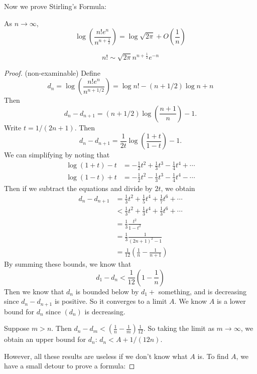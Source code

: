 \documentclass[a4paper]{article}
\begin{document}
Now we prove Stirling's Formula:
\begin{thm}
  As $n\to \infty$,
  \[
    \log\left(\frac{n! e^n}{n^{n + \frac{1}{2}}}\right) = \log \sqrt{2\pi} + O\left(\frac{1}{n}\right)
  \]
\end{thm}
\begin{cor}
  \[
    n!\sim \sqrt{2\pi}n^{n + \frac{1}{2}} e^{-n}
  \]
\end{cor}
\begin{proof}(non-examinable)
  Define 
  \[
    d_n = \log \left(\frac{n!e^n}{n^{n + 1/2}}\right) = \log n! - (n + 1/2)\log n + n
  \]
  Then
  \[
    d_n - d_{n + 1} = (n + 1/2)\log\left(\frac{n + 1}{n}\right) - 1.
  \]
  Write $t = 1/(2n + 1)$. Then
  \[
    d_n - d_{n + 1} = \frac{1}{2t}\log\left(\frac{1 + t}{1 - t}\right) - 1.
  \]
  We can simplifying by noting that
  \begin{align*}
    \log (1 + t) - t &= -\frac{1}{2}t^2 + \frac{1}{3}t^3 - \frac{1}{4}t^4 + \cdots\\
    \log (1 - t) + t &= -\frac{1}{2}t^2 - \frac{1}{3}t^3 - \frac{1}{4}t^4 - \cdots
  \end{align*}
  Then if we subtract the equations and divide by $2t$, we obtain
  \begin{align*}
    d_n - d_{n + 1} &= \frac{1}{3}t^2 + \frac{1}{5}t^4 + \frac{1}{7}t^6 + \cdots\\
    &< \frac{1}{3}t^2 + \frac{1}{3}t^4 + \frac{1}{3}t^6 + \cdots\\
    &= \frac{1}{3}\frac{t^2}{1 - t^2}\\
    &= \frac{1}{3}\frac{1}{(2n + 1)^2 - 1}\\
    &= \frac{1}{12}\left(\frac{1}{n} - \frac{1}{n + 1}\right)
  \end{align*}
  By summing these bounds, we know that
  \[
    d_1 - d_n < \frac{1}{12}\left(1 - \frac{1}{n}\right)
  \]
  Then we know that $d_n$ is bounded below by $d_1 +$ something, and is decreasing since $d_n - d_{n + 1}$ is positive. So it converges to a limit $A$. We know $A$ is a lower bound for $d_n$ since $(d_n)$ is decreasing.

  Suppose $m > n$. Then $d_n - d_m < \left(\frac{1}{n} - \frac{1}{m}\right)\frac{1}{12}$. So taking the limit as $m\to \infty$, we obtain an upper bound for $d_n$: $d_n < A + 1/(12n)$.

  However, all these results are useless if we don't know what $A$ is. To find $A$, we have a small detour to prove a formula:


\end{proof}
\end{document}
